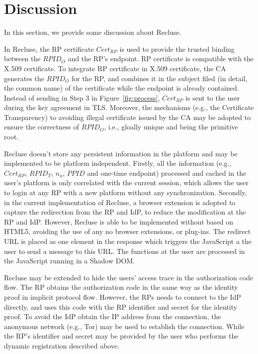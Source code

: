 \section{Discussion}
\label{sec:discussion}
In this section, we provide some discussion about Recluse.

 In Recluse, the RP certificate $Cert_{RP}$ is used to provide the trusted binding between the $RPID_O$ and the RP's endpoint. RP certificate is compatible with the X.509 certificate. To integrate RP certificate in X.509 certificate, the CA generates the $RPID_O$ for the RP, and combines it in the subject  filed (in detail, the common name)  of the certificate while the endpoint is already contained. Instead of sending  in Step 3 in Figure~\ref{fig:process}, $Cert_{RP}$  is sent to the user during the key agreement in TLS. Moreover, the mechanisms (e.g., the Certificate Transparency) to avoiding illegal certificate issued by the CA may be adopted to ensure the correctness of $RPID_O$, i.e., gloally unique and being the primitive root.


 Recluse doesn't store any persistent  information in the platform and may be implemented to be platform independent. Firstly, all the information (e.g., $Cert_{RP}$, $RPID_T$, $n_u$, $PPID$ and one-time endpoint) processed and cached in the user's platform is only correlated with the current session, which allows the user to login at any RP with a new platform without any synchronization. Secondly, in the current implementation of Recluse, a browser extension is adopted to capture the redirection from the RP and IdP, to reduce the modification at the RP and IdP. However, Recluse is able to be implemented without based on HTML5, avoiding the use of any no browser extensions, or plug-ins. The redirect URL is placed as one element in the response which triggers the JavaScript a the user to send a message to this URL. The functions at the user are processed in the JavaScript running in a Shadow DOM.


 Recluse may be extended to hide the users' access trace in  the authorization code flow. The RP obtains the authorization code in the same way as the  identity proof in implicit protocol flow. However, the RPs needs to connect to the IdP directly, and  uses this code with  the RP identifier and secret for the identity proof. To avoid the IdP obtain the IP address from the connection, the anonymous network (e.g., Tor) may be used to establish the connection. While the RP's identifier and secret may be provided by the user who performs the dynamic registration described above.

